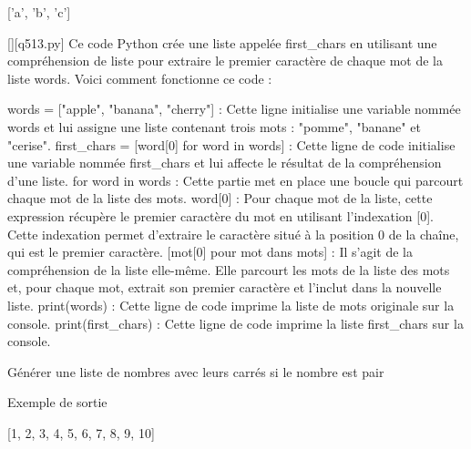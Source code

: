 ['a', 'b', 'c']
        \par
        \begin{solution}
            \renewcommand{\nomfichier}{q513.py}
            \pythonfile{\chemincode \nomfichier}[][\nomfichier]
            Ce code Python crée une liste appelée first_chars en utilisant une compréhension de liste pour extraire le premier caractère de chaque mot de la liste words. Voici comment fonctionne ce code :

    words = ["apple", "banana", "cherry"] : Cette ligne initialise une variable nommée words et lui assigne une liste contenant trois mots : "pomme", "banane" et "cerise".
    first_chars = [word[0] for word in words] : Cette ligne de code initialise une variable nommée first_chars et lui affecte le résultat de la compréhension d'une liste.
        for word in words : Cette partie met en place une boucle qui parcourt chaque mot de la liste des mots.
        word[0] : Pour chaque mot de la liste, cette expression récupère le premier caractère du mot en utilisant l'indexation [0]. Cette indexation permet d'extraire le caractère situé à la position 0 de la chaîne, qui est le premier caractère.
        [mot[0] pour mot dans mots] : Il s'agit de la compréhension de la liste elle-même. Elle parcourt les mots de la liste des mots et, pour chaque mot, extrait son premier caractère et l'inclut dans la nouvelle liste.
    print(words) : Cette ligne de code imprime la liste de mots originale sur la console.
    print(first_chars) : Cette ligne de code imprime la liste first_chars sur la console.
        \end{solution}
        

        \question
        Générer une liste de nombres avec leurs carrés si le nombre est pair

Exemple de sortie

[1, 2, 3, 4, 5, 6, 7, 8, 9, 10]

